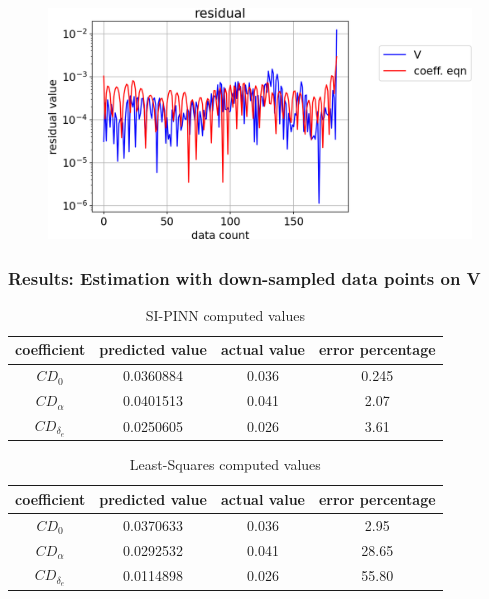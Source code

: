 \begin{frame}
\begin{columns}
\begin{column}{0.5\linewidth}
		\end{column}
	\end{columns}
	\begin{figure}
		\includegraphics[scale=0.35]{supportingFiles/residual.png}
	\end{figure}
\end{frame}

\begin{frame}
	\frametitle{Results: Estimation with down-sampled data points on V}

	\begin{table}
		\caption{SI-PINN computed values}
		\begin{tabular}{|c|c|c|c|}
		\hline
			coefficient & predicted value & actual value & error percentage \\ \hline \hline
			\(CD_0\)        &  0.0360884       & 0.036         & 0.245           \\ \hline
			\(CD_\alpha\)   & 0.0401513        & 0.041         & 2.07           \\ \hline
			\(CD_{\delta_e}\)     &  0.0250605      & 0.026       & 3.61          \\ \hline
		\end{tabular}
	\end{table}

	\begin{table}
		\caption{Least-Squares computed values}
		\begin{tabular}{|c|c|c|c|}
		\hline
			coefficient & predicted value & actual value & error percentage \\ \hline \hline
			\(CD_0\)        &   0.0370633      & 0.036         & 2.95            \\ \hline
			\(CD_\alpha\)   &  0.0292532       & 0.041         & 28.65           \\ \hline
			\(CD_{\delta_e}\)     & 0.0114898       & 0.026       & 55.80          \\ \hline
		\end{tabular}
	\end{table}

\end{frame}

